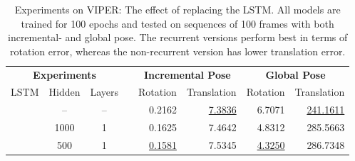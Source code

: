 		\begin{table}[tb]
			\small
			\begin{center}
				\begin{tabular}{ccccrrrr}
					\toprule
					\multicolumn{3}{c}{\textbf{Experiments}} & & \multicolumn{2}{c}{\textbf{Incremental Pose}} & \multicolumn{2}{c}{\textbf{Global Pose}} \\
					LSTM 	& Hidden 	& Layers	& 	& Rotation & Translation & Rotation & Translation \\
					\midrule
					\xmark	& -- 		& --		&	& 0.2162	& \underline{7.3836}	& 6.7071	& \underline{241.1611}		\\
					
					\cmark	& 1000		& 1			& 	& 0.1625&	7.4642 	& 4.8312&	285.5663		\\
					\cmark 	& 500		& 1			& 	&\underline{0.1581}	&7.5345 	& \underline{4.3250}&	286.7348	 \\
					\bottomrule
					
				\end{tabular}
			\end{center}
			\caption[Experiments on VIPER: The effect of replacing the LSTM]
					{Experiments on VIPER: The effect of replacing the LSTM.
					 All models are trained for 100 epochs and tested on sequences of 100 frames with both incremental- and global pose.
					 The recurrent versions perform best in terms of rotation error, whereas the non-recurrent version has lower translation error.
					 \label{tbl:viper-effect-of-replacing-LSTM}}
		\end{table}
		
